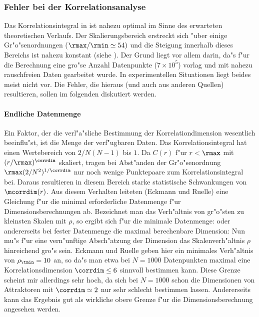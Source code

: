 \subsubsection{Fehler bei der Korrelationsanalyse}
Das Korrelationsintegral in  ist nahezu optimal im Sinne des erwarteten 
theoretischen Verlaufs. Der Skalierungsbereich 
erstreckt sich "uber einige Gr"o"senordnungen ($\rmax/\rmin\simeq 54)$ und die Steigung innerhalb
dieses Bereichs ist nahezu konstant (siehe ). Der Grund liegt vor allem
darin, da"s f"ur die Berechnung eine gro"se Anzahl Datenpunkte ($7\times10^5$) vorlag und
mit nahezu rauschfreien Daten gearbeitet wurde. In experimentellen Situationen liegt
beides meist nicht vor. Die Fehler, die hieraus (und auch aus anderen Quellen) resultieren,
sollen im folgenden diskutiert werden.




\paragraph{Endliche Datenmenge}
Ein Faktor, der die verl"a"sliche Bestimmung der Korrelationdimension wesentlich
beeinflu"st, ist die Menge der verf"ugbaren Daten. Das Korrelationsintegral hat einen
Wertebereich von $2/N(N-1)$ bis $1$. Da $C(r)$ f"ur $r<\rmax$ mit $(r/\rmax)^\corrdim$ skaliert, tragen
bei Abst"anden der Gr"o"senordnung $\rmax(2/N^2)^{1/\corrdim}$ nur noch wenige Punktepaare 
zum Korrelationsintegral bei. Daraus resultieren in diesem Bereich starke statistische
Schwankungen von $\mcorrdim(r)$. Aus diesem Verhalten leiteten \autor(Eckmann und Ruelle)
\cite{Eckmann-ruelle2} eine Gleichung f"ur die minimal erforderliche Datenmenge f"ur
Dimensionsberechnungen ab. Bezeichnet man das Verh"altnis von gr"o"sten zu kleinsten
Skalen mit $\rho$, so ergibt sich f"ur die minimale Datenmenge:
oder andererseits bei fester Datenmenge die maximal berechenbare Dimension:
Nun mu"s f"ur eine vern"unftige Absch"atzung der Dimension das Skalenverh"altnis $\rho$
hinreichend gro"s sein. Eckmann und Ruelle geben hier ein minimales Verh"altnis von
$\rho_\tmin=10$ an, so da"s man etwa bei $N=1000$ Datenpunkten maximal eine
Korrelationsdimension $\corrdim\leq 6$ sinnvoll bestimmen kann. Diese Grenze scheint mir
allerdings sehr hoch, da sich bei $N=1000$ schon die Dimensionen von Attraktoren mit
$\corrdim\simeq 2$ nur sehr schlecht bestimmen lassen. Andererseits kann das Ergebnis gut
als wirkliche obere Grenze f"ur die Dimensionsberechnung angesehen werden. 




